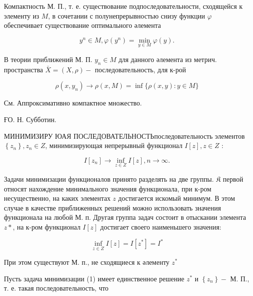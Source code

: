\documentclass[10pt]{article}
\begin{document}
Компактность М. П., т. е. существование подпоследовательности, сходящейся к элементу из $M$, в сочетании с полунепрерывностью снизу функции $\varphi$ обеспечивает существование оптимального әлемента



\[

y^{n} \in M, \varphi\left(y^{n}\right)=\min _{y \in M} \varphi(y) .

\]



В теории приближений М. П. $y_{n} \in M$ для данного әлемента из метрич. пространства $\bar{X}=(X, \rho)-$ последовательность, для к-рой



\[

\rho\left(x, y_{n}\right) \rightarrow \rho(x, M)=\inf \{\rho(x, y): y \in M\}

\]



См. Аппроксимативно компактное множество.



ҒО. Н. Субботин.



МИНИМИЗИРУ ЮАЯ ПОСЛЕДОВАТЕЛЬНОСТЬпоследовательность элементов $\left\{z_{n}\right\}, z_{n} \in Z$, минимизирующая непрерывный функционал $I[z], z \in Z$ :



\[

I\left[z_{n}\right] \longrightarrow \inf _{z \in Z} I[z], n \longrightarrow \infty .

\]



Задачи минимизации функционалов принято разделять на две группы. $\mathfrak{K}$ первой относят нахождение минимального значения функционала, при к-ром несущественно, на каких элементах $z$ достигается искомый минимум. В этом случае в качестве приближенных решений можно использовать значения функционала на любой М. п. Другая группа задач состоит в отыскании элемента $z *$, на к-ром функционал $I[z]$ достигает своего наименьшего значения:



\[

\inf _{z \in Z} I[z]=I\left[z^{*}\right]=I^{*}

\]



При этом существуют М. п., не сходящиеся к әлементу $z^{*}$



Пусть задача минимизации (1) имеет единственное решение $z^{*}$ и $\left\{z_{n}\right\}-$ М. П., т. е. такая последовательность, что
\end{document}

